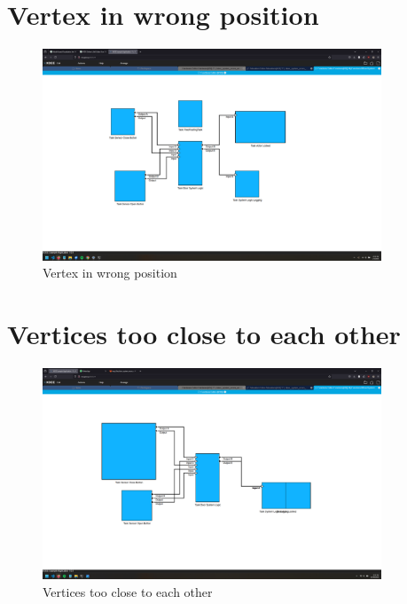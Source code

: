 \documentclass{article}
\begin{document}
\section{Vertex in wrong position}
\begin{figure}[H]
    \centering
    \includegraphics[width=0.9\textwidth]{images/vertex_in_wrong_position.png}
    \caption{Vertex in wrong position}
\end{figure}
\newpage

\section{Vertices too close to each other}
\begin{figure}[H]
    \centering
    \includegraphics[width=0.9\textwidth]{images/vertices_too_close_to_each_other.png}
    \caption{Vertices too close to each other}
\end{figure}
\newpage
\end{document}
